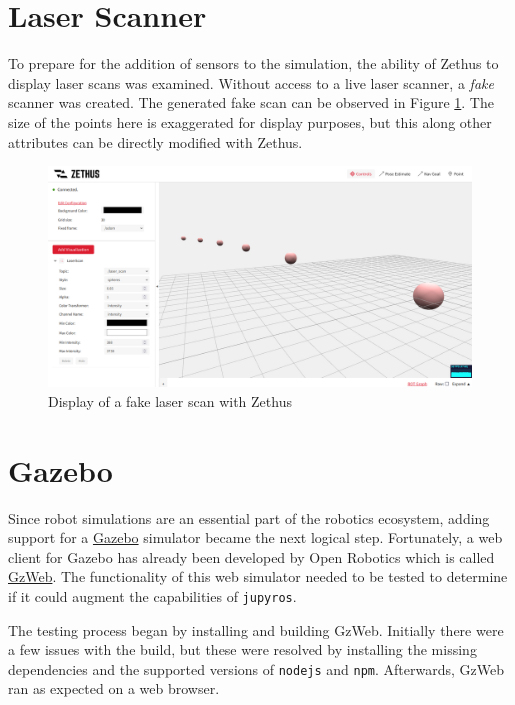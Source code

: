\section{Laser Scanner}

    To prepare for the addition of sensors to the simulation, the ability of Zethus to display laser scans was examined. Without access to a live laser scanner, a \textit{fake} scanner was created. The generated fake scan can be observed in Figure \ref{fig:laser}. The size of the points here is exaggerated for display purposes, but this along other attributes can be directly modified with Zethus.

\begin{figure}[H]
    \centering
    \includegraphics[width=\linewidth]{Images/04_laser.png}
    \caption{Display of a fake laser scan with Zethus}
    \label{fig:laser}
\end{figure}


\section{Gazebo}

    Since robot simulations are an essential part of the robotics ecosystem, adding support for a \href{https://gazebosim.org/home}{Gazebo} simulator became the next logical step. Fortunately, a web client for Gazebo has already been developed by Open Robotics which is called \href{https://github.com/osrf/gzweb}{GzWeb}. The functionality of this web simulator needed to be tested to determine if it could augment the capabilities of \texttt{jupyros}. 
    
    The testing process began by installing and building GzWeb. Initially there were a few issues with the build, but these were resolved by installing the missing dependencies and the supported versions of \texttt{nodejs} and \texttt{npm}. Afterwards, GzWeb ran as expected on a web browser.
    

